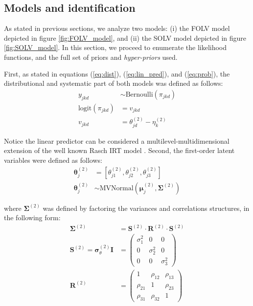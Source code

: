 \subsection{Models and identification}

As stated in previous sections, we analyze two models: (i) the FOLV model depicted in figure \ref{fig:FOLV_model}, and (ii) the SOLV model depicted in figure \ref{fig:SOLV_model}. In this section, we proceed to enumerate the likelihood functions, and the full set of priors and \textit{hyper-priors} used. 

First, as stated in equations (\ref{eq:dist}), (\ref{eq:lin_pred}), and (\ref{eq:prob}), the distributional and systematic part of both models was defined as follows:
%
\begin{align}
	y_{jkd} &\sim \text{Bernoulli}( \pi_{jkd} ) \\
%
	\text{logit}( \pi_{jkd} ) &= v_{jkd} \\
	v_{jkd} &= \theta^{(2)}_{jd} - \eta^{(2)}_{k}
\end{align}

Notice the linear predictor can be considered a multilevel-multidimensional extension of the well known Rasch IRT model \cite{Rasch_1980}. Second, the first-order latent variables were defined as follows:
%
\begin{align}
	\boldsymbol{\theta}^{(2)}_{j} &= \left[ \theta_{j1}^{(2)}, \theta_{j2}^{(2)}, \theta_{j3}^{(2)} \right] \\
	\boldsymbol{\theta}^{(2)}_{j} &\sim \text{MVNormal} \left( \boldsymbol{\mu}^{(2)}_{j}, \boldsymbol{\Sigma}^{(2)} \right)
\end{align}

where $\boldsymbol{\Sigma}^{(2)}$ was defined by factoring the variances and correlations structures, in the following form:
%
\begin{align}
	\boldsymbol{\Sigma}^{(2)} &= \boldsymbol{S}^{(2)} \cdot \boldsymbol{R}^{(2)} \cdot \boldsymbol{S}^{(2)} \\
	\boldsymbol{S}^{(2)} = \pmb{\sigma}^{(2)}_{\theta} \mathbf{I} &= 
	\begin{pmatrix}
		\sigma^{2}_{1}	& 0 			 	& 0 				\\
		0 				& \sigma^{2}_{2} 	& 0 				\\
		0 				& 0					& \sigma^{2}_{3} 
	\end{pmatrix} \\
	\boldsymbol{R}^{(2)} &= 
	\begin{pmatrix}
		1			& \rho_{12} & \rho_{13} 	\\
		\rho_{21} 	& 1 		& \rho_{23} 	\\
		\rho_{31} 	& \rho_{32}	& 1	
	\end{pmatrix} 
\end{align}

